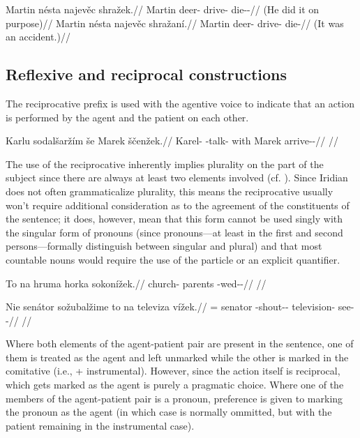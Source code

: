 \pex
\a
\begingl
	\gla Martin nésta najev\v{e}c shražek.//
	\glb Martin deer-\Acc{} drive-\Cv{} die-\Av{}-\Pf{}//
	\glft {} (He did it on purpose)//
\endgl
\a
\begingl
	\gla Martin nésta najev\v{e}c shražaní.//
	\glb Martin deer-\Acc{} drive-\Cv{} die-//
	\glft {} (It was an accident.)//
\endgl
\xe

\subsection{Reflexive and reciprocal constructions}

The reciprocative prefix  is used with the agentive voice to indicate that an action is performed by the agent and the patient on each other.

\pex
\begingl
\gla Karlu sodalšaržím še Marek ščenžek.//
\glb Karel-\Ins{} \Rec{}-talk- with Marek arrive-\Av{}-\Pf{}//
\glft {}//
\endgl
\xe

The use of the reciprocative inherently implies plurality on the part of the subject since there are always at least two elements involved (cf. \cite[255]{tesniere1965}). Since Iridian does not often grammaticalize plurality, this means the reciprocative usually won't require additional consideration as to the agreement of the constituents of the sentence; it does, however, mean that this form cannot be used singly with the singular form of pronouns (since pronouns---at least in the first and second persons---formally distinguish between singular and plural) and that most countable nouns would require the use of the particle  or an explicit quantifier.

\pex
\begingl
\gla To na hruma horka sokonížek.//
\glb \Dem{} \Loc{} church-\Acc{} parents \Rec{}-wed-\Av{}-\Pf{}//
\glft {}//
\endgl
\xe

\pex
\begingl
\gla Nie senátor sožubalžime to na televiza vížek.//
\glb \Pl{}= senator \Rec{}-shout-\Av{}-\Prog{}  \Loc{} television-\Acc{} see-\Av{}-\Pf{}//
\glft {}//
\endgl
\xe

Where both elements of the agent-patient pair are present in the sentence, one of them is treated as the agent and left unmarked while the other is marked in the comitative (i.e.,  + instrumental). However, since the action itself is reciprocal, which gets marked as the agent is purely a pragmatic choice. Where one of the members of the agent-patient pair is a pronoun, preference is given to marking the pronoun as the agent (in which case  is normally ommitted, but with the patient remaining in the instrumental case).

